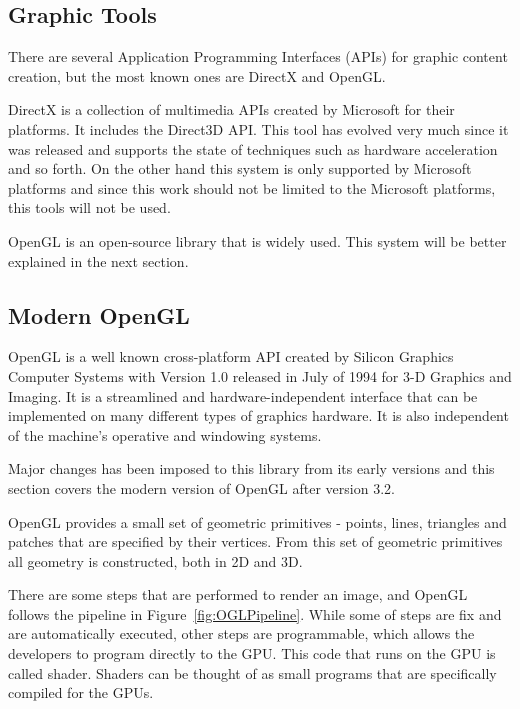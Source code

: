 
\subsection{Graphic Tools} %
\label{sub:graphic_tools}
There are several Application Programming Interfaces (APIs) for graphic content creation, but the most known ones are DirectX and OpenGL. 

DirectX is a collection of multimedia APIs created by Microsoft for their platforms. It includes the Direct3D API. This tool has evolved very much since it was released and supports the state of techniques such as hardware acceleration and so forth.  On the other hand this system is only supported by Microsoft platforms and since this work should not be limited to the Microsoft platforms, this tools will not be used. 

OpenGL is an open-source library that is widely used. This system will be better explained in the next section.

\subsection{Modern OpenGL} %
\label{sub:modern_opengl}


OpenGL is a well known cross-platform API created by Silicon Graphics Computer Systems with Version 1.0 released in July of 1994 for 3-D Graphics and Imaging. It is a streamlined and hardware-independent interface that can be implemented on many different types of graphics hardware. It is also independent of the machine's operative and windowing systems.

Major changes has been imposed to this library from its early versions and this section covers the modern version of OpenGL after version 3.2.

OpenGL provides a small set of geometric primitives - points, lines, triangles and patches that are specified by their vertices. From this set of geometric primitives all geometry is constructed, both in 2D and 3D. 

There are some steps that are performed to render an image, and OpenGL follows the pipeline in Figure~\ref{fig:OGLPipeline}. While some of steps are fix and are automatically executed, other steps are programmable, which allows the developers to program directly to the GPU. This code that runs on the GPU is called shader. Shaders can be thought of as small programs that are specifically compiled for the GPUs\cite{shreiner2013opengl}.

